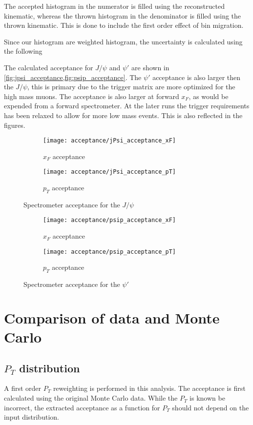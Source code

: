 \documentclass[../main.tex]{subfiles}
\begin{document}
The accepted histogram in the numerator is filled using the reconstructed kinematic, whereas
the thrown histogram in the denominator is filled using the thrown kinematic. This is done to include
the first order effect of bin migration.

Since our histogram are weighted histogram, the uncertainty is calculated using the following

The calculated acceptance for $J/\psi$ and $\psi'$ are shown in \cref{fig:jpsi_acceptance,fig:psip_acceptance}.
The $\psi'$ acceptance is also larger then the $J/\psi$, this is primary due to the 
trigger matrix are more optimized for the high mass muons. The acceptance is also larger at forward $x_F$,
as would be expended from a forward spectrometer.
At the later runs the trigger requirements has been relaxed to allow for more low mass events.
This is also reflected in the figures.  
\begin{figure}[h!]
	\label{fig:jpsi_acceptance}
	\centering
	\begin{subfigure}{0.45\linewidth}
		\texttt{[image: acceptance/jPsi\_acceptance\_xF]}
		\caption{$x_F$ acceptance}
	\end{subfigure}
	\begin{subfigure}{0.45\linewidth}
		\texttt{[image: acceptance/jPsi\_acceptance\_pT]}
		\caption{$p_T$ acceptance}
	\end{subfigure}
	\caption{Spectrometer acceptance for the $J/\psi$}
\end{figure}
\begin{figure}[h!]
	\label{fig:psip_acceptance}
	\centering
	\begin{subfigure}{0.45\linewidth}
		\texttt{[image: acceptance/psip\_acceptance\_xF]}
		\caption{$x_F$ acceptance}
	\end{subfigure}
	\begin{subfigure}{0.45\linewidth}
		\texttt{[image: acceptance/psip\_acceptance\_pT]}
		\caption{$p_T$ acceptance}
	\end{subfigure}
	\caption{Spectrometer acceptance for the $\psi'$}
\end{figure}
\section{Comparison of data and Monte Carlo}

\subsection{\texorpdfstring{$P_T$}{P\_T} distribution}
A first order $P_T$ reweighting is performed in this analysis. The acceptance is first 
calculated using the original Monte Carlo data. While the $P_T$ is known be incorrect,
the extracted acceptance as a function for $P_T$ should not depend on the input
distribution.
\end{document}
